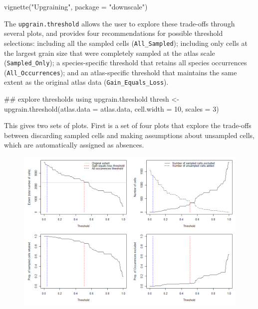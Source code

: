 \documentclass{article}[12pt, a4paper]
\begin{document}
\begin{Schunk}
\begin{Sinput}
vignette("Upgraining", package = "downscale")
\end{Sinput}
\end{Schunk}

The \texttt{upgrain.threshold} allows the user to explore these trade-offs through several plots, and provides four recommendations for possible threshold selections: including all the sampled cells (\texttt{All\_Sampled}); including only cells at the largest grain size that were completely sampled at the atlas scale (\texttt{Sampled\_Only}); a species-specific threshold that retains all species occurrences (\texttt{All\_Occurrences}); and an atlas-specific threshold that maintains the same extent as the original atlas data (\texttt{Gain\_Equals\_Loss}).

\begin{Schunk}
\begin{Sinput}
## explore thresholds using upgrain.threshold
thresh <- upgrain.threshold(atlas.data = atlas.data,
                            cell.width = 10,
                            scales = 3)
\end{Sinput}
\end{Schunk}

This gives two sets of plots. First is a set of four plots that explore the trade-offs between discarding sampled cells and making assumptions about unsampled cells, which are automatically assigned as absences.

\begin{figure}[!h]
\centering
\includegraphics[width=12cm]{Threshold_plots.png}
\end{figure}
\end{document}
